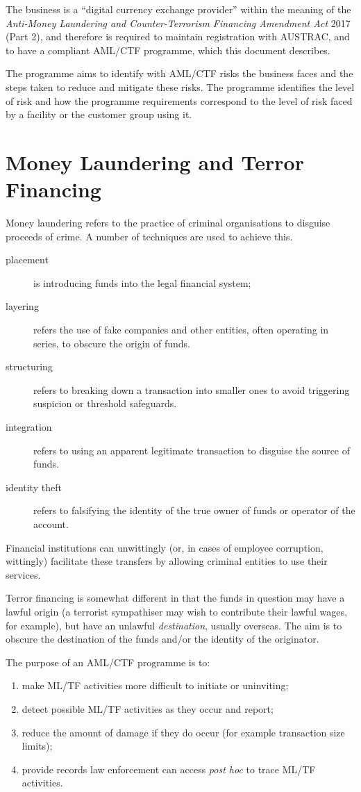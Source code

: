 \documentclass[12pt]{report}
\begin{document}
The business is a ``digital currency exchange provider'' within the meaning of the
\emph{Anti-Money Laundering and Counter-Terrorism Financing Amendment Act} 2017 (Part 2),
and therefore is required to maintain registration with AUSTRAC, and to have a compliant
AML/CTF programme, which this document describes.

The programme aims to identify with AML/CTF risks the business faces and the steps
taken to reduce and mitigate these risks. The programme identifies the level of risk and
how the programme requirements correspond to the level of risk faced by a facility or the customer group
using it.

\section{Money Laundering and Terror Financing}

Money laundering refers to the practice of criminal organisations to disguise proceeds of crime. A number of techniques
are used to achieve this.

\begin{description}
\item[placement] is introducing funds into the legal financial system;
\item[layering] refers the use of fake companies and other entities, often operating in series, to obscure the origin of funds.
\item[structuring] refers to breaking down a transaction into smaller ones to avoid triggering suspicion or threshold
  safeguards.
\item[integration] refers to using an apparent legitimate transaction to disguise the source of funds.
  \item[identity theft] refers to falsifying the identity of the true owner of funds or operator of the account.
\end{description}

Financial institutions can unwittingly (or, in cases of employee corruption, wittingly) facilitate these transfers
by allowing criminal entities to use their services.

Terror financing is somewhat different in that the funds in question may have a lawful origin (a terrorist
sympathiser may wish to contribute their lawful wages, for example), but have an unlawful \emph{destination}, usually overseas.
The aim is to obscure the destination of the funds and/or the identity of the originator.

The purpose of an AML/CTF programme is to:
\begin{enumerate}
\item make ML/TF activities more difficult to initiate or uninviting;
\item detect possible ML/TF activities as they occur and report;
\item reduce the amount of damage if they do occur (for example transaction size limits);
\item provide records law enforcement can access \emph{post hoc} to trace ML/TF activities.
\end{enumerate}
\end{document}
